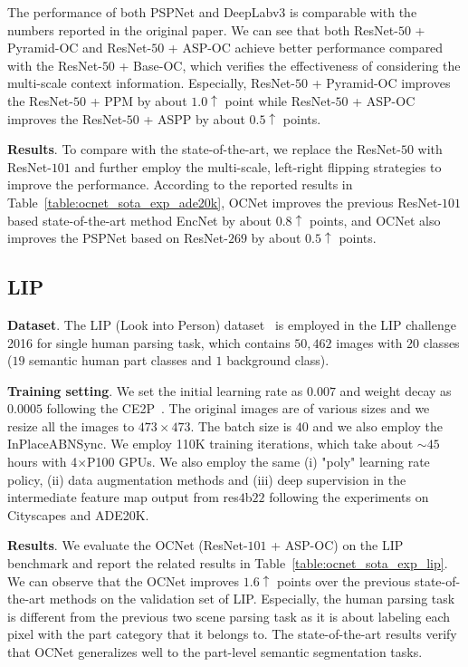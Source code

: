 \documentclass[10pt,twocolumn,letterpaper]{article}
\begin{document}
The performance of both PSPNet and DeepLabv3 is comparable with the numbers reported in the original paper.
We can see that both ResNet-$50$ + Pyramid-OC and ResNet-$50$ + ASP-OC achieve better performance compared with the ResNet-$50$ + Base-OC, which verifies the effectiveness of considering the multi-scale context information.
Especially, ResNet-$50$ + Pyramid-OC improves the ResNet-$50$ + PPM by about $1.0 \uparrow $ point while ResNet-$50$ + ASP-OC improves the ResNet-$50$ + ASPP by about $0.5 \uparrow $ points.

\vspace{0.1cm}
\noindent\textbf{Results}.
To compare with the state-of-the-art, we replace the ResNet-$50$ with ResNet-$101$ and further employ the multi-scale, left-right flipping strategies to improve the performance.
According to the reported results in Table~\ref{table:ocnet_sota_exp_ade20k}, OCNet improves the previous ResNet-$101$ based state-of-the-art method EncNet by about $0.8 \uparrow $ points,
and OCNet also improves the PSPNet based on ResNet-$269$ by about $0.5 \uparrow $ points.

\subsection{LIP}

\noindent\textbf{Dataset}.
The LIP (Look into Person) dataset~\cite{Gong_2017_CVPR} is employed in the LIP challenge 2016 for single human parsing task, which contains $50,462$ images with $20$ classes ($19$ semantic human part classes and $1$ background class).

\vspace{.1cm}
\noindent\textbf{Training setting}.
We set the initial learning rate as $0.007$ and weight decay as $0.0005$ following the CE2P~\cite{liu2018devil}. 
The original images are of various sizes and we resize all the images to $473\times473$. 
The batch size is $40$ and we also employ the InPlaceABNSync. 
We employ 110K training iterations, which take about $\sim45$ hours with 4$\times$P100 GPUs.
We also employ the same (i) "poly" learning rate policy, (ii) data augmentation methods and (iii) deep supervision in the intermediate feature map output from res$4$b$22$ following the experiments on 
Cityscapes and ADE20K.

\vspace{0.1cm}
\noindent\textbf{Results}.
We evaluate the OCNet (ResNet-$101$ + ASP-OC) on the LIP benchmark and report
the related results in Table~\ref{table:ocnet_sota_exp_lip}. We can observe that the OCNet improves $1.6 \uparrow$ points over the previous state-of-the-art methods on the validation set of LIP. 
Especially, the human parsing task is different from the previous two scene parsing task as it is about labeling each pixel with the part category that it belongs to.
The state-of-the-art results verify that OCNet generalizes well to the part-level semantic segmentation tasks.
\end{document}
